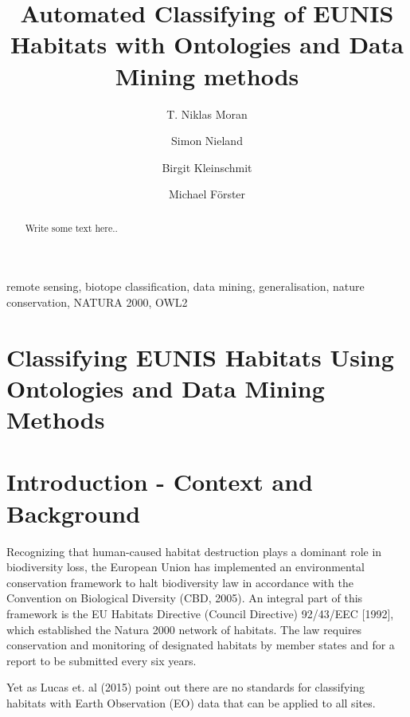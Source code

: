 \documentclass[authoryear, review,12pt,number]{elsarticle}
\begin{document}
\begin{frontmatter}
\linenumbers
\title{Automated Classifying of EUNIS Habitats with Ontologies and Data Mining
methods}


\author[TUB]{T. Niklas Moran}

\author[TUB]{Simon Nieland}
\author[TUB]{Birgit Kleinschmit}

\author[TUB]{Michael F\"orster}

\address[TUB]{Geoinformation in Environmental Planning Lab, Technische
Universit\"at Berlin, Stra\ss e des 17. Juni 145, 10623 Berlin, Germany}

\begin{abstract}
Write some text here..
\end{abstract}

\begin{keyword}
remote sensing, biotope classification, data mining,
generalisation, nature conservation, NATURA 2000, OWL2
\end{keyword}

\end{frontmatter}

\linenumbers
\section{Classifying EUNIS Habitats Using Ontologies and Data Mining Methods}

\section{Introduction - Context and Background}
Recognizing that human-caused habitat destruction plays a dominant role in
biodiversity loss, the European Union has implemented an environmental
conservation framework to halt biodiversity law in accordance with the
Convention on Biological Diversity (CBD, 2005). An integral part of this
framework is the EU Habitats Directive (Council Directive) 92/43/EEC [1992],
which established the Natura 2000 network of habitats. The law requires
conservation and monitoring of designated habitats by member states and for a
report to be submitted every six years. 

Yet as Lucas et. al (2015) point out there are no standards for classifying
habitats with Earth Observation (EO) data that can be applied to all sites. 
\end{document}

